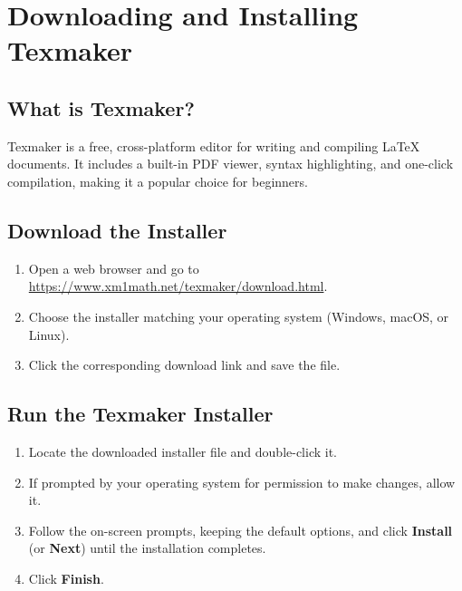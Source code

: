 \documentclass[../main.tex]{subfiles}
\begin{document}
\section{Downloading and Installing Texmaker}

\subsection{What is Texmaker?}
Texmaker is a free, cross-platform editor for writing and
compiling \LaTeX{} documents. It includes a built-in PDF viewer,
syntax highlighting, and one-click compilation, making it a
popular choice for beginners.

\subsection{Download the Installer}
\begin{enumerate}[leftmargin=*]
    \item Open a web browser and go to
    \url{https://www.xm1math.net/texmaker/download.html}.
    \item Choose the installer matching your operating system
    (Windows, macOS, or Linux).
    \item Click the corresponding download link and save the
    file.
\end{enumerate}

\subsection{Run the Texmaker Installer}
\begin{enumerate}[leftmargin=*]
    \item Locate the downloaded installer file and double-click
    it.
    \item If prompted by your operating system for permission to
    make changes, allow it.
    \item Follow the on-screen prompts, keeping the default
    options, and click \textbf{Install} (or \textbf{Next}) until
    the installation completes.
    \item Click \textbf{Finish}.
\end{enumerate}
\end{document}
